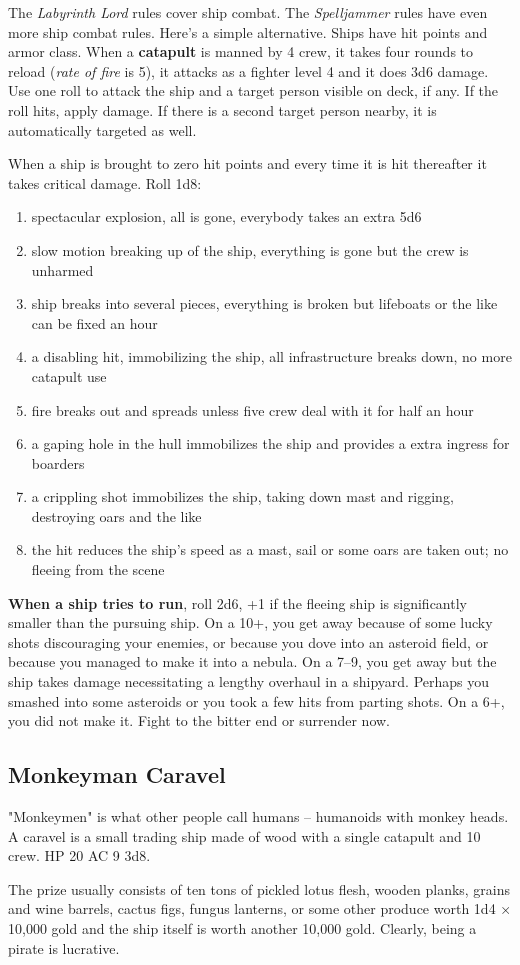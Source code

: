 \documentclass[11pt]{bxart}
\begin{document}
The \textit{Labyrinth Lord} rules cover ship combat. The \textit{Spelljammer} rules have even more ship combat rules. Here's a simple alternative. Ships have hit points and armor class. When a \textbf{catapult} is manned by 4 crew, it takes four rounds to reload (\textit{rate of fire} is 5), it attacks as a fighter level 4 and it does 3d6 damage. Use one roll to attack the ship and a target person visible on deck, if any. If the roll hits, apply damage. If there is a second target person nearby, it is automatically targeted as well.

When a ship is brought to zero hit points and every time it is hit thereafter it takes critical damage. Roll 1d8:

\begin{enumerate}
\item spectacular explosion, all is gone, everybody takes an extra 5d6
\item slow motion breaking up of the ship, everything is gone but the crew is unharmed
\item ship breaks into several pieces, everything is broken but lifeboats or the like can be fixed an hour
\item a disabling hit, immobilizing the ship, all infrastructure breaks down, no more catapult use
\item fire breaks out and spreads unless five crew deal with it for half an hour
\item a gaping hole in the hull immobilizes the ship and provides a extra ingress for boarders
\item a crippling shot immobilizes the ship, taking down mast and rigging, destroying oars and the like
\item the hit reduces the ship's speed as a mast, sail or some oars are taken out; no fleeing from the scene
\end{enumerate}

\textbf{When a ship tries to run}, roll 2d6, +1 if the fleeing ship is significantly smaller than the pursuing ship. On a 10+, you get away because of some lucky shots discouraging your enemies, or because you dove into an asteroid field, or because you managed to make it into a nebula. On a 7--9, you get away but the ship takes damage necessitating a lengthy overhaul in a shipyard. Perhaps you smashed into some asteroids or you took a few hits from parting shots. On a 6+, you did not make it. Fight to the bitter end or surrender now.

\subsection{Monkeyman Caravel}

"Monkeymen" is what other people call humans – humanoids with monkey heads. A caravel is a small trading ship made of wood with a single catapult and 10 crew. HP 20 AC 9 3d8.

The prize usually consists of ten tons of pickled lotus flesh, wooden planks, grains and wine barrels, cactus figs, fungus lanterns, or some other produce worth 1d4 × 10,000 gold and the ship itself is worth another 10,000 gold. Clearly, being a pirate is lucrative.
\end{document}
